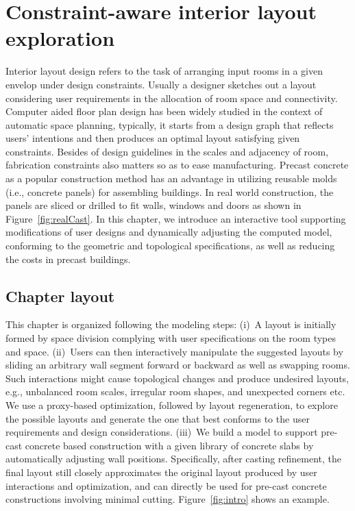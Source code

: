 

\chapter{Constraint-aware interior layout exploration}
\label{chapter3}

Interior layout design refers to the task of arranging input rooms in a given envelop under design constraints. Usually a designer sketches out a layout considering user requirements in the allocation of room space and connectivity. Computer aided floor plan design has been widely studied in the context of automatic space planning, typically, it starts from a design graph that reflects users' intentions and then produces an optimal layout satisfying given constraints. Besides of design guidelines in the scales and adjacency of room, fabrication constraints also matters so as to ease manufacturing. Precast concrete as a popular construction method has an advantage in utilizing reusable molds (i.e., concrete panels) for assembling buildings. In real world construction, the panels are sliced or drilled to fit walls, windows and doors as shown in Figure~\ref{fig:realCast}. In this chapter, we introduce an interactive tool supporting modifications of user designs and dynamically adjusting the computed model, conforming to the geometric and topological specifications, as well as reducing the costs in precast buildings.

\section{Chapter layout}

This chapter is organized following the modeling steps:
(i)~A layout is initially formed by space division complying with user specifications on the room types and space.
(ii)~Users can then interactively manipulate the suggested layouts by sliding an arbitrary wall segment forward or backward as well as swapping rooms. Such interactions might cause topological changes and produce undesired layouts, e.g., unbalanced room scales, irregular room shapes, and unexpected corners etc. We use a proxy-based optimization, followed by layout regeneration, to explore the possible layouts and generate the one that best conforms to the user requirements and design considerations.
(iii)~We build a model to support pre-cast concrete based construction with a given library of concrete slabs by automatically adjusting wall positions. Specifically, after casting refinement, the final layout still closely approximates the original layout produced by user interactions and optimization, and can directly be used for pre-cast concrete constructions involving minimal cutting. Figure~\ref{fig:intro} shows an example.

